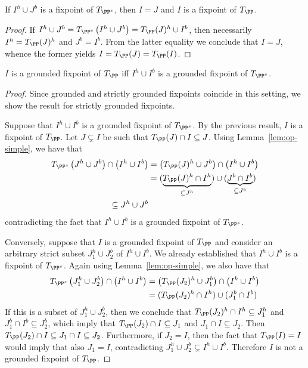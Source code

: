 \begin{proposition}
  \label{prop:simple-fp}
  If $I^h\cup J^b$ is a fixpoint of $T_{\PP^s}$, then $I=J$ and $I$ is a fixpoint of $T_\PP$.
\end{proposition}
\begin{proof}
  If $I^h\cup J^b=T_{\PP^s}\left(I^h\cup J^b\right)=T_\PP(J)^h\cup I^b$, then necessarily $I^h=T_\PP(J)^h$ and $J^b=I^b$.
  From the latter equality we conclude that $I=J$, whence the former yields $I=T_\PP(J)=T_\PP(I)$.
\end{proof}

\begin{proposition}
  \label{prop:simple-gf}
  $I$ is a grounded fixpoint of $T_\PP$ iff $I^h\cup I^b$ is a grounded fixpoint of $T_{\PP^s}$.
\end{proposition}
\begin{proof}
  Since grounded and strictly grounded fixpoints coincide in this setting, we show the result for strictly grounded fixpoints.

  Suppose that $I^h\cup I^b$ is a grounded fixpoint of $T_{\PP^s}$.
  By the previous result, $I$ is a fixpoint of $T_\PP$.
  Let $J\subsetneq I$ be such that $T_\PP(J)\cap I\subseteq J$.
  Using Lemma~\ref{lem:op-simple}, we have that
  \begin{align*}
    T_{\PP^s}\left(J^h\cup J^b\right)\cap\left(I^h\cup I^b\right) &=
    \left(T_\PP(J)^h\cup J^b\right)\cap\left(I^h\cup I^b\right) \\
    &= (\underbrace{T_\PP(J)^h\cap I^h}_{\subseteq J^h})\cup(\underbrace{J^b\cap I^b}_{\subseteq J^b}) \\
    \subseteq J^h\cup J^b
  \end{align*}
  contradicting the fact that $I^h\cup I^b$ is a grounded fixpoint of $T_{\PP^s}$.

  Conversely, suppose that $I$ is a grounded fixpoint of $T_\PP$ and consider an arbitrary strict subset $J_1^h\cup J_2^b$ of $I^h\cup I^b$.
  We already established that $I^h\cup I^b$ is a fixpoint of $T_{\PP^s}$.
  Again using Lemma~\ref{lem:op-simple}, we also have that
  \begin{align*}
    T_{\PP^s}\left(J_1^h\cup J_2^b\right)\cap\left(I^h\cup I^b\right) &=
    \left(T_\PP(J_2)^h\cup J_1^b\right)\cap\left(I^h\cup I^b\right) \\
    &= (T_\PP(J_2)^h\cap I^h)\cup(J_1^b\cap I^b)
  \end{align*}
  If this is a subset of $J_1^h\cup J_2^b$, then we conclude that $T_\PP(J_2)^h\cap I^h\subseteq J_1^h$ and $J_1^b\cap I^b\subseteq J_2^b$, which imply that
  $T_\PP(J_2)\cap I\subseteq J_1$ and $J_1\cap I\subseteq J_2$.
  Then $T_\PP(J_2)\cap I\subseteq J_1\cap I\subseteq J_2$.
  Furthermore, if $J_2=I$, then the fact that $T_\PP(I)=I$ would imply that also $J_1=I$, contradicting $J_1^h\cup J_2^b\subsetneq I^h\cup I^b$.
  Therefore $I$ is not a grounded fixpoint of $T_\PP$.
\end{proof}

